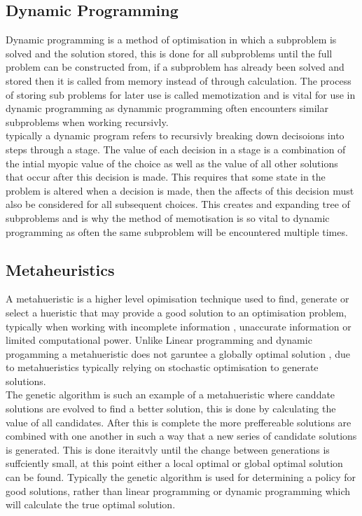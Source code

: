 \subsection{Dynamic Programming} 
Dynamic programming is a method of optimisation in which a subproblem is solved and the solution stored, this is done for all subproblems until the full problem can be constructed from, if a subproblem has already been solved and stored then it is called from memory instead of through calculation. The process of storing sub problems for later use is called memotization and is vital for use in dynamic programming as dynammic programming often encounters similar subproblems when working recursivly. \\
typically a dynamic program refers to recursivly breaking down decisoions into steps through a stage. The value of each decision in a stage is a combination of the intial myopic value of the choice as well as the value of all other solutions that occur after this decision is made. This requires that some state in the problem is altered when a decision is made, then the affects of this decision must also be considered for all subsequent choices. This creates and expanding tree of subproblems and is why the method of memotisation is so vital to dynamic programming as often the same subproblem will be encountered multiple times. 
\subsection{Metaheuristics} %
A metahueristic is a higher level opimisation technique used to find, generate or select a hueristic that may provide a good solution to an optimisation problem, typically when working with incomplete information , unaccurate information or limited computational power. Unlike Linear programming and dynamic progamming a metahueristic does not garuntee a globally optimal solution , due to metahueristics typically relying on stochastic optimisation to generate solutions. \\
The genetic algorithm is such an example of a metahueristic where canddate solutions are evolved to find a better solution, this is done by calculating the value of all candidates. After this is complete the more preffereable solutions are combined with one another in such a way that a new series of candidate solutions is generated. This is done iteraitvly until the change between generations is suffciently small, at this point either a local optimal or global optimal solution can be found. Typically the genetic algorithm is used for determining a policy for good solutions, rather than linear programming or dynamic programming which will calculate the true optimal solution. 
